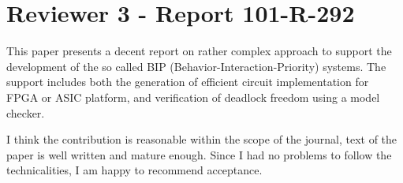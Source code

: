 \section{Reviewer 3 - Report 101-R-292}
%
%
This paper presents a decent report on rather complex approach to support the
development of the so called BIP (Behavior-Interaction-Priority) systems. The
support includes both the generation of efficient circuit implementation for
FPGA or ASIC platform, and verification of deadlock freedom using a model checker.

I think the contribution is reasonable within the scope of the journal, text of
the paper is well written and mature enough. Since I had no problems to follow
the technicalities, I am happy to recommend acceptance.

~

